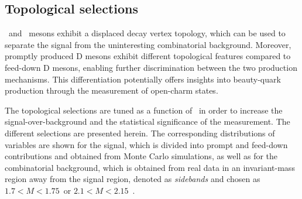 \subsection{Topological selections}
\ds\ and \dpl\ mesons exhibit a displaced decay vertex topology, which can be used to separate the signal from the uninteresting combinatorial background. Moreover, promptly produced D mesons exhibit different topological features compared to feed-down D mesons, enabling further discrimination between the two production mechanisms. This differentiation potentially offers insights into beauty-quark production through the measurement of open-charm states. 

The topological selections are tuned as a function of \pt\ in order to increase the signal-over-background and the statistical significance of the measurement. The different selections are presented herein. The corresponding distributions of variables are shown for the signal, which is divided into prompt and feed-down contributions and obtained from Monte Carlo simulations, as well as for the combinatorial background, which is obtained from real data in an invariant-mass region away from the signal region, denoted as \emph{sidebands} and chosen as $1.7<M<1.75$~\gevcc or $2.1<M<2.15$~\gevcc.

